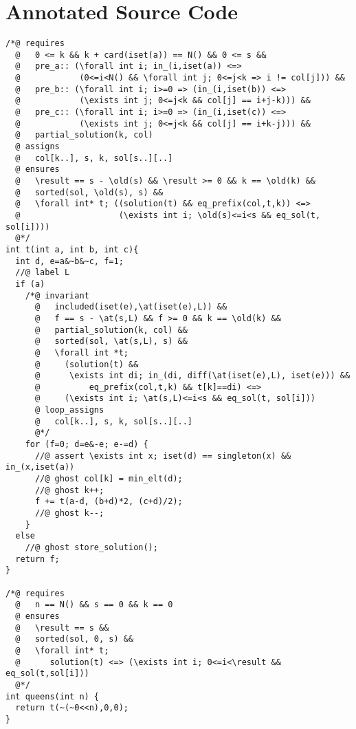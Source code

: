 \documentclass[a4paper]{llncs}
\begin{document}
\nocite{*}



\appendix
\section{Annotated Source Code}\label{app:code}
{\footnotesize
\begin{verbatim}
/*@ requires
  @   0 <= k && k + card(iset(a)) == N() && 0 <= s &&
  @   pre_a:: (\forall int i; in_(i,iset(a)) <=> 
  @            (0<=i<N() && \forall int j; 0<=j<k => i != col[j])) &&
  @   pre_b:: (\forall int i; i>=0 => (in_(i,iset(b)) <=> 
  @            (\exists int j; 0<=j<k && col[j] == i+j-k))) &&
  @   pre_c:: (\forall int i; i>=0 => (in_(i,iset(c)) <=> 
  @            (\exists int j; 0<=j<k && col[j] == i+k-j))) &&
  @   partial_solution(k, col)
  @ assigns
  @   col[k..], s, k, sol[s..][..]
  @ ensures  
  @   \result == s - \old(s) && \result >= 0 && k == \old(k) &&
  @   sorted(sol, \old(s), s) &&
  @   \forall int* t; ((solution(t) && eq_prefix(col,t,k)) <=>
  @                    (\exists int i; \old(s)<=i<s && eq_sol(t, sol[i])))
  @*/
int t(int a, int b, int c){
  int d, e=a&~b&~c, f=1;
  //@ label L
  if (a)
    /*@ invariant 
      @   included(iset(e),\at(iset(e),L)) &&
      @   f == s - \at(s,L) && f >= 0 && k == \old(k) && 
      @   partial_solution(k, col) &&
      @   sorted(sol, \at(s,L), s) &&
      @   \forall int *t; 
      @     (solution(t) && 
      @      \exists int di; in_(di, diff(\at(iset(e),L), iset(e))) &&
      @          eq_prefix(col,t,k) && t[k]==di) <=>
      @     (\exists int i; \at(s,L)<=i<s && eq_sol(t, sol[i]))
      @ loop_assigns
      @   col[k..], s, k, sol[s..][..]
      @*/
    for (f=0; d=e&-e; e-=d) {
      //@ assert \exists int x; iset(d) == singleton(x) && in_(x,iset(a)) 
      //@ ghost col[k] = min_elt(d);
      //@ ghost k++;                
      f += t(a-d, (b+d)*2, (c+d)/2);
      //@ ghost k--;                
    }
  else 
    //@ ghost store_solution();
  return f;
}

/*@ requires 
  @   n == N() && s == 0 && k == 0
  @ ensures 
  @   \result == s &&
  @   sorted(sol, 0, s) &&
  @   \forall int* t; 
  @      solution(t) <=> (\exists int i; 0<=i<\result && eq_sol(t,sol[i]))
  @*/
int queens(int n) {
  return t(~(~0<<n),0,0);
}
\end{verbatim}
}
\end{document}

